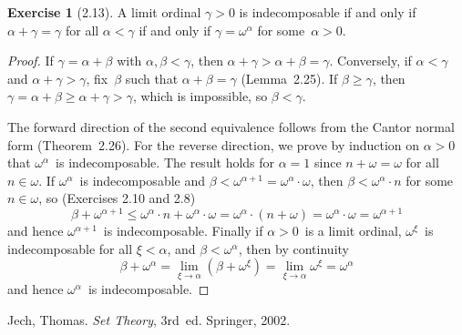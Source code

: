 \documentclass[letterpaper,12pt]{article}
\newcommand{\mult}{\cdot}
\theoremstyle{definition}
\newtheorem*{exer}{Exercise}
\theoremstyle{remark}
\begin{document}
\begin{exer}[2.13]
A limit ordinal \(\gamma>0\) is indecomposable if and only if \(\alpha+\gamma=\gamma\) for all \(\alpha<\gamma\) if and only if \(\gamma=\omega^{\alpha}\) for some~\(\alpha>0\).
\end{exer}
\begin{proof}
If \(\gamma=\alpha+\beta\) with \(\alpha,\beta<\gamma\), then \(\alpha+\gamma>\alpha+\beta=\gamma\). Conversely, if \(\alpha<\gamma\) and \(\alpha+\gamma>\gamma\), fix~\(\beta\) such that \(\alpha+\beta=\gamma\) (Lemma~2.25). If \(\beta\ge\gamma\), then \(\gamma=\alpha+\beta\ge\alpha+\gamma>\gamma\), which is impossible, so \(\beta<\gamma\).

The forward direction of the second equivalence follows from the Cantor normal form (Theorem~2.26). For the reverse direction, we prove by induction on \(\alpha>0\) that \(\omega^{\alpha}\)~is indecomposable. The result holds for \(\alpha=1\) since \(n+\omega=\omega\) for all \(n\in\omega\). If \(\omega^{\alpha}\)~is indecomposable and \(\beta<\omega^{\alpha+1}=\omega^{\alpha}\mult\omega\), then \(\beta<\omega^{\alpha}\mult n\) for some \(n\in\omega\), so (Exercises 2.10 and 2.8)
\[\beta+\omega^{\alpha+1}\le\omega^{\alpha}\mult n+\omega^{\alpha}\mult\omega=\omega^{\alpha}\mult(n+\omega)=\omega^{\alpha}\mult\omega=\omega^{\alpha+1}\]
and hence \(\omega^{\alpha+1}\)~is indecomposable. Finally if \(\alpha>0\)~is a limit ordinal, \(\omega^{\xi}\)~is indecomposable for all \(\xi<\alpha\), and \(\beta<\omega^{\alpha}\), then by continuity
\[\beta+\omega^{\alpha}=\lim_{\xi\to\alpha}(\beta+\omega^{\xi})=\lim_{\xi\to\alpha}\omega^{\xi}=\omega^{\alpha}\]
and hence \(\omega^{\alpha}\)~is indecomposable.
\end{proof}

\begin{thebibliography}{0}
 Jech, Thomas. \textit{Set Theory}, 3rd~ed. Springer, 2002.
\end{thebibliography}
\end{document}
